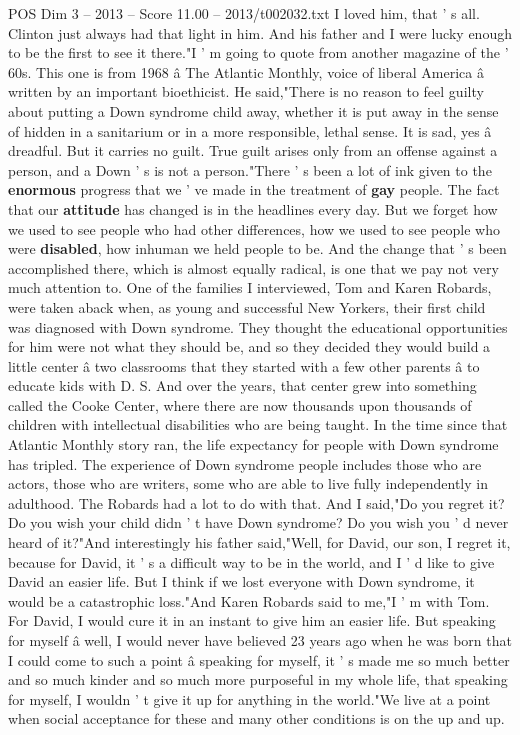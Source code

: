 \begin{textsample}{POS Dim 3 – 2013 – Score 11.00 – 2013/t002032.txt}
I loved him, that ' s all.
Clinton just always had that light in him.
And his father and I were lucky enough to be the first to see it there."I ' m going to quote from another magazine of the ' 60s.
This one is from 1968 â The Atlantic Monthly, voice of liberal America â written by an important bioethicist.
He said,"There is no reason to feel guilty about putting a Down syndrome child away, whether it is put away in the sense of hidden in a sanitarium or in a more responsible, lethal sense.
It is sad, yes â dreadful.
But it carries no guilt.
True guilt arises only from an offense against a person, and a Down ' s is not a person."There ' s been a lot of ink given to the \textbf{enormous} progress that we ' ve made in the treatment of \textbf{gay} people.
The fact that our \textbf{attitude} has changed is in the headlines every day.
But we forget how we used to see people who had other differences, how we used to see people who were \textbf{disabled}, how inhuman we held people to be.
And the change that ' s been accomplished there, which is almost equally radical, is one that we pay not very much attention to.
One of the families I interviewed, Tom and Karen Robards, were taken aback when, as young and successful New Yorkers, their first child was diagnosed with Down syndrome.
They thought the educational opportunities for him were not what they should be, and so they decided they would build a little center â two classrooms that they started with a few other parents â to educate kids with D.
S.
And over the years, that center grew into something called the Cooke Center, where there are now thousands upon thousands of children with intellectual disabilities who are being taught.
In the time since that Atlantic Monthly story ran, the life expectancy for people with Down syndrome has tripled.
The experience of Down syndrome people includes those who are actors, those who are writers, some who are able to live fully independently in adulthood.
The Robards had a lot to do with that.
And I said,"Do you regret it?
Do you wish your child didn ' t have Down syndrome?
Do you wish you ' d never heard of it?"And interestingly his father said,"Well, for David, our son, I regret it, because for David, it ' s a difficult way to be in the world, and I ' d like to give David an easier life.
But I think if we lost everyone with Down syndrome, it would be a catastrophic loss."And Karen Robards said to me,"I ' m with Tom.
For David, I would cure it in an instant to give him an easier life.
But speaking for myself â well, I would never have believed 23 years ago when he was born that I could come to such a point â speaking for myself, it ' s made me so much better and so much kinder and so much more purposeful in my whole life, that speaking for myself, I wouldn ' t give it up for anything in the world."We live at a point when social acceptance for these and many other conditions is on the up and up.

\end{textsample}

